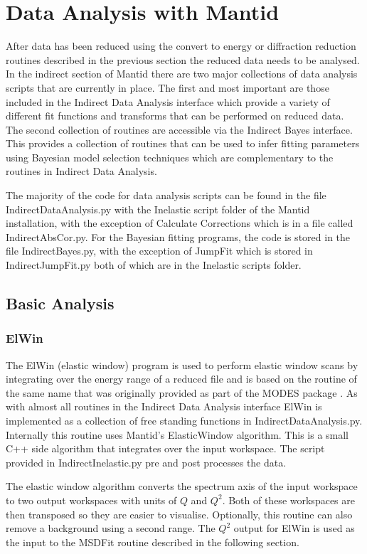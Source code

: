 \documentclass[paper=a4, fontsize=11pt]{scrartcl}	%
\numberwithin{equation}{section}															%
\numberwithin{figure}{section}																%
\numberwithin{table}{section}																%
\begin{document}
\clearpage
\section{Data Analysis with Mantid}

After data has been reduced using the convert to energy or diffraction reduction routines described in the previous section the reduced data needs to be analysed. In the indirect section of Mantid there are two major collections of data analysis scripts that are currently in place. The first  and most important are those included in the Indirect Data Analysis interface which provide a variety of different fit functions and transforms that can be performed on reduced data. The second collection of routines are accessible via the Indirect Bayes interface. This provides a collection of routines that can be used to infer fitting parameters using Bayesian model selection techniques which are complementary to the routines in Indirect Data Analysis.

The majority of the code for data analysis scripts can be found in the file IndirectDataAnalysis.py with the Inelastic script folder of the Mantid installation, with the exception of Calculate Corrections which is in a file called IndirectAbsCor.py. For the Bayesian fitting programs, the code is stored in the file IndirectBayes.py, with the exception of JumpFit which is stored in IndirectJumpFit.py both of which are in the Inelastic scripts folder.

\subsection{Basic Analysis}
\subsubsection{ElWin}
The ElWin (elastic window) program is used to perform elastic window scans by integrating over the energy range of a reduced file and is based on the routine of the same name that was originally provided as part of the MODES package \citep{wshowells2010}. As with almost all routines in the Indirect Data Analysis interface ElWin is implemented as a collection of free standing functions in IndirectDataAnalysis.py. Internally this routine uses Mantid's ElasticWindow algorithm. This is a small C++ side algorithm that integrates over the input workspace. The script provided in IndirectInelastic.py pre and post processes the data. 

The elastic window algorithm converts the spectrum axis of the input workspace to two output workspaces with units of $Q$ and $Q^2$. Both of these workspaces are then transposed so they are easier to visualise. Optionally, this routine can also remove a background using a second range. The $Q^2$ output for ElWin is used as the input to the MSDFit routine described in the following section.
\end{document}
